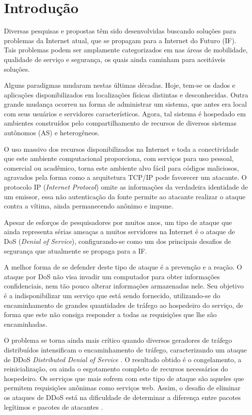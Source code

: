 \documentclass[a4paper, 12pt]{article}
\begin{document}
\section{Introdução}


Diversas pesquisas e propostas têm sido desenvolvidas buscando soluções para problemas da Internet atual, que se propagam para a Internet do Futuro (IF). Tais problemas podem ser amplamente categorizados em nas áreas de mobilidade, qualidade de serviço e segurança, os quais ainda caminham para aceitáveis soluções.

Alguns paradigmas mudaram nestas últimas décadas. Hoje, tem-se os dados e aplicações disponibilizados em localizações físicas distintas e desconhecidas. Outra grande mudança ocorreu na forma de administrar um sistema, que antes era local com seus usuários e servidores característicos. Agora, tal sistema é hospedado em ambientes construídos pelo compartilhamento de recursos de diversos sistemas autônomos (AS) e heterogêneos.

O uso massivo dos recursos disponibilizados na Internet e toda a conectividade que este ambiente computacional proporciona, com serviços para uso pessoal, comercial ou acadêmico, torna este ambiente alvo fácil para códigos maliciosos, agravados pela forma como a arquitetura TCP/IP pode favorecer um atacante. O protocolo IP (\emph{Internet Protocol}) omite as informações da verdadeira identidade de um emissor, essa não autenticação da fonte permite ao atacante realizar o ataque contra a vítima, ainda permanecendo anônimo e impune.

Apesar de esforços de pesquisadores por muitos anos, um tipo de ataque que ainda representa sérias ameaças a muitos servidores na Internet é o ataque de DoS (\emph{Denial of Service}), configurando-se como um dos principais desafios de segurança que atualmente se propaga para a IF. 


A melhor forma de se defender deste tipo de ataque é a prevenção e a reação. O ataque por DoS não visa invadir um computador para obter informações confidenciais, nem tão pouco alterar informações armazenadas nele. Seu objetivo é a indisponibilizar um serviço que está sendo fornecido, utilizando-se do encaminhamento de grandes quantidades de tráfego ao hospedeiro do serviço, de forma que este não consiga responder a todas as requisições que lhe são encaminhadas. 

O problema se torna ainda mais crítico quando diversos geradores de tráfego distribuídos intensificam o encaminhamento de tráfego, caracterizando um ataque de DDoS \emph{Distributed Denial of Service} \cite{Sachdeva08ddosincidents}. O resultado obtido é o congelamento, a reinicialização, ou ainda o esgotamento completo de recursos necessários do hospedeiro. Os serviços que mais sofrem com este tipo de ataque são aqueles que permitem requisições anônimas como serviços web. Assim, o desafio de eliminar os ataques de DDoS está na dificuldade de determinar a diferença entre pacotes legítimos e pacotes de atacantes \cite{Li:2009:DDA:1683304.1684620}.
\end{document}
